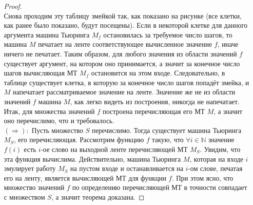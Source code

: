 \documentclass[11pt]{article}
\begin{document}
\begin{proof}
 \leavevmode
    \\
    Снова проходим эту таблицу змейкой так, как показано на рисунке (все клетки, как ранее было показано, будут посещены). Если в некоторой клетке для данного аргумента машина Тьюринга $M_f$ остановилась за требуемое число шагов, то машина $M$ печатает на ленте соответствующее вычисленное значение $f$, иначе ничего не печатает. Таким образом, для любого значения из области значений $f$ существует аргумент, на котором оно принимается, а значит за конечное число шагов вычисляющая МТ $M_f$ остановится на этом входе. Следовательно, в таблице существует клетка, в которую за конечное число шагов попадёт змейка, и $M$ напечатает рассматриваемое значение на ленте. Значение же не из области значений $f$ машина $M$, как легко видеть из построения, никогда не напечатает. Итак, для множества значений $f$ построена перечисляющая его МТ $M$, а значит оно перечислимо, что и требовалось. \\
    $(\Longrightarrow):$ Пусть множество $S$ перечислимо. Тогда существует машина Тьюринга $M_S$, его перечисляющая. Рассмотрим функцию $f$ такую, что $\forall i \in \mathbb{N}$ значение $f(i)$ есть $i$-ое слово на выходной ленте перечисляющей МТ $M_S$. Увидим, что эта функция вычислима. Действительно, машина Тьюринга $M$, которая на входе $i$ эмулирует работу $M_S$ на пустом входе и останавливается на $i$-ом слове, печатая его на ленту, является вычисляющей МТ для функции $f$. При этом ясно, что множество значений $f$ по определению перечисляющей МТ в точности совпадает с множеством $S$, а значит теорема доказана.
\end{proof}
\end{document}

